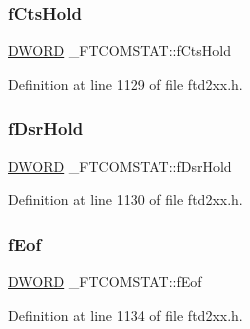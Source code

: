\subsubsection{\texorpdfstring{f\+Cts\+Hold}{fCtsHold}}
{\footnotesize\ttfamily \hyperlink{CatCaloProto40MHz_2inc_2WinTypes_8h_ad342ac907eb044443153a22f964bf0af}{D\+W\+O\+RD} \+\_\+\+F\+T\+C\+O\+M\+S\+T\+A\+T\+::f\+Cts\+Hold}



Definition at line 1129 of file ftd2xx.\+h.

\mbox{\label{struct__FTCOMSTAT_a63c6ff1a00dd690b0bf9347c949a59c8}} 
\subsubsection{\texorpdfstring{f\+Dsr\+Hold}{fDsrHold}}
{\footnotesize\ttfamily \hyperlink{CatCaloProto40MHz_2inc_2WinTypes_8h_ad342ac907eb044443153a22f964bf0af}{D\+W\+O\+RD} \+\_\+\+F\+T\+C\+O\+M\+S\+T\+A\+T\+::f\+Dsr\+Hold}



Definition at line 1130 of file ftd2xx.\+h.

\mbox{\label{struct__FTCOMSTAT_a2a4cdfc245e72f74b032f7a5cc220fd3}} 
\subsubsection{\texorpdfstring{f\+Eof}{fEof}}
{\footnotesize\ttfamily \hyperlink{CatCaloProto40MHz_2inc_2WinTypes_8h_ad342ac907eb044443153a22f964bf0af}{D\+W\+O\+RD} \+\_\+\+F\+T\+C\+O\+M\+S\+T\+A\+T\+::f\+Eof}



Definition at line 1134 of file ftd2xx.\+h.

\mbox{\label{struct__FTCOMSTAT_a567f611e7f3dc193ff94ac4c44fbc500}} 
